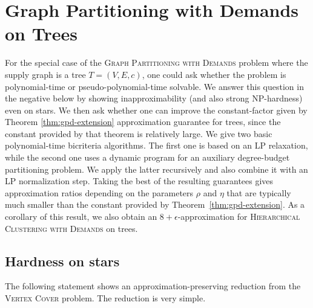 \section{Graph Partitioning with Demands on Trees}\label{sec:tree-configuration-lp}

For the special case of the \textsc{Graph Partitioning with Demands} problem where the supply graph is a tree $T=(V,E,c)$, one could ask whether the problem is polynomial-time or pseudo-polynomial-time solvable.
We answer this question in the negative below by showing inapproximability (and also strong NP-hardness) even on stars.
We then ask whether one can improve the constant-factor given by Theorem \ref{thm:gpd-extension} approximation guarantee for trees, since the constant provided by that theorem is relatively large.
We give two basic polynomial-time bicriteria algorithms. The first one is based on an LP relaxation, while the second one uses a dynamic program for an auxiliary degree-budget partitioning problem. We apply the latter recursively and also combine it with an LP normalization step. Taking the best of the resulting guarantees gives approximation ratios depending on the parameters $\rho$ and $\eta$ that are typically much smaller than the constant provided by Theorem~\ref{thm:gpd-extension}. As a corollary of this result, we also obtain an $8+\epsilon$-approximation for \textsc{Hierarchical Clustering with Demands} on trees.

\subsection{Hardness on stars}

The following statement shows an approximation-preserving reduction from the \textsc{Vertex Cover} problem. The reduction is very simple.

